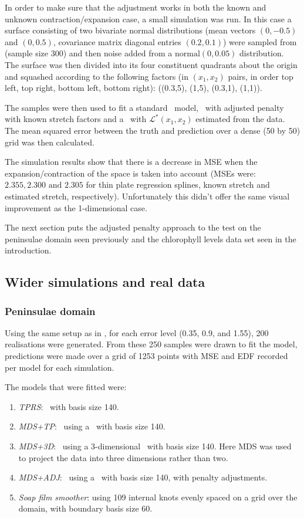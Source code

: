 In order to make sure that the adjustment works in both the known and unknown contraction/expansion case, a small simulation was run. In this case a surface consisting of two bivariate normal distributions (mean vectors $(0,-0.5)$ and $(0,0.5)$, covariance matrix diagonal entries $(0.2,0.1)$) were sampled from (sample size 300) and then noise added from a $\text{normal}(0,0.05)$ distribution. The surface was then divided into its four constituent quadrants about the origin and squashed according to the following factors (in $(x_1,x_2)$ pairs, in order top left, top right, bottom left, bottom right): ((0.3,5), (1,5), (0.3,1), (1,1)).

The samples were then used to fit a standard \tprs\ model, \tprs\ with adjusted penalty with known stretch factors and a \tprs\ with $\mathcal{L}^*(x_1,x_2)$ estimated from the data. The mean squared error between the truth and prediction over a dense (50 by 50) grid was then calculated.

The simulation results show that there is a decrease in MSE when the expansion/contraction of the space is taken into account (MSEs were: $2.355, 2.300 \text{ and } 2.305$ for thin plate regression splines, known stretch and estimated stretch, respectively). Unfortunately this didn't offer the same visual improvement as the 1-dimensional case.

The next section puts the adjusted penalty approach to the test on the peninsulae domain seen previously and the chlorophyll levels data set seen in the introduction.

\subsection{Wider simulations and real data}

\subsubsection{Peninsulae domain}
\label{wt2bigsim}

Using the same setup as in , for each error level (0.35, 0.9, and 1.55), 200 realisations were generated. From these 250 samples were drawn to fit the model, predictions were made over a grid of 1253 points with MSE and EDF recorded per model for each simulation. 

The models that were fitted were:
\begin{enumerate}
\item \emph{TPRS}: \tprs\ with basis size 140.
\item \emph{MDS+TP}: \mdsap\ using a \tprs\ with basis size 140.
\item \emph{MDS+3D}: \mdsap\ using a 3-dimensional \tprs\ with basis size 140. Here MDS was used to project the data into three dimensions rather than two.
\item \emph{MDS+ADJ}: \mdsap\ using a \tprs\ with basis size 140, with penalty adjustments.
\item \emph{Soap film smoother}: using 109 internal knots evenly spaced on a grid over the domain, with boundary basis size 60.
\end{enumerate}

